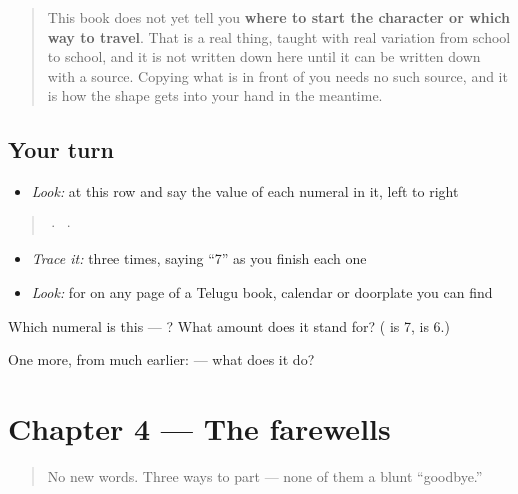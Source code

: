 \begin{quote}
This book does not yet tell you \textbf{where to start the character or which way to travel}. That is a real thing, taught with real variation from school to school, and it is not written down here until it can be written down with a source. Copying what is in front of you needs no such source, and it is how the shape gets into your hand in the meantime.
\end{quote}

\subsection*{Your turn}
\begin{itemize}
\raggedright
  \item \emph{Look:} at this row and say the value of each numeral in it, left to right
\end{itemize}

\begin{quote}
  ·    ·  
\end{quote}

\begin{itemize}
\raggedright
  \item \emph{Trace it:}  three times, saying \textquotedblleft{}7\textquotedblright{} as you finish each one
  \item \emph{Look:} for  on any page of a Telugu book, calendar or doorplate you can find
\end{itemize}

\begin{tcolorbox}[breakable,colback=teal!4,colframe=teal!35!black,title={Before you move on}]
Which numeral is this — ? What amount does it stand for? ( is 7,  is 6.)

One more, from much earlier:  — what does it do?
\end{tcolorbox}
\section[Practice]{Chapter 4 — The farewells}

\label{lesson:TE-C04-practice}



\begin{quote}
No new words. Three ways to part — none of them a blunt \textquotedblleft{}goodbye.\textquotedblright{}
\end{quote}

